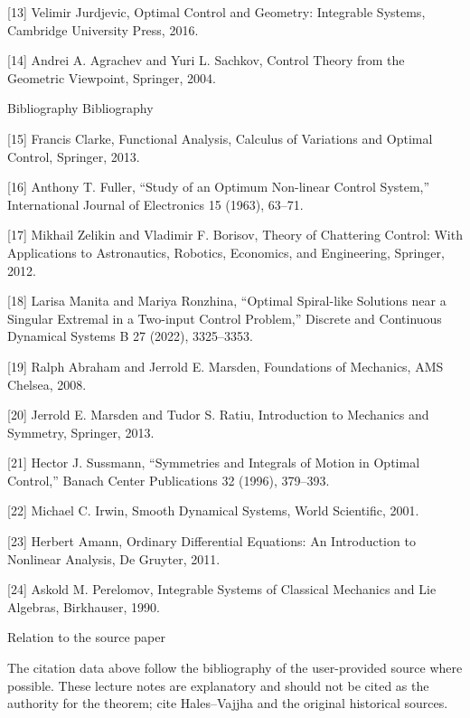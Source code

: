 [13] Velimir Jurdjevic, Optimal Control and Geometry: Integrable Systems, Cambridge University Press, 2016.


[14] Andrei A. Agrachev and Yuri L. Sachkov, Control Theory from the Geometric Viewpoint, Springer, 2004.


Bibliography Bibliography


[15] Francis Clarke, Functional Analysis, Calculus of Variations and Optimal Control, Springer, 2013.


[16] Anthony T. Fuller, “Study of an Optimum Non-linear Control System,” International Journal of Electronics 15 (1963), 63–71.


[17] Mikhail Zelikin and Vladimir F. Borisov, Theory of Chattering Control: With Applications to Astronautics, Robotics, Economics, and Engineering, Springer, 2012.


[18] Larisa Manita and Mariya Ronzhina, “Optimal Spiral-like Solutions near a Singular Extremal in a Two-input Control Problem,” Discrete and Continuous Dynamical Systems B 27 (2022), 3325–3353.


[19] Ralph Abraham and Jerrold E. Marsden, Foundations of Mechanics, AMS Chelsea, 2008.


[20] Jerrold E. Marsden and Tudor S. Ratiu, Introduction to Mechanics and Symmetry, Springer, 2013.


[21] Hector J. Sussmann, “Symmetries and Integrals of Motion in Optimal Control,” Banach Center Publications 32 (1996), 379–393.


[22] Michael C. Irwin, Smooth Dynamical Systems, World Scientific, 2001.


[23] Herbert Amann, Ordinary Differential Equations: An Introduction to Nonlinear Analysis, De Gruyter, 2011.


[24] Askold M. Perelomov, Integrable Systems of Classical Mechanics and Lie Algebras, Birkhauser, 1990.


\begin{insightbox}{Relation to the source paper}
\end{insightbox}

The citation data above follow the bibliography of the user-provided source where possible. These lecture notes are explanatory and should not be cited as the authority for the theorem; cite Hales–Vajjha and the original historical sources.

